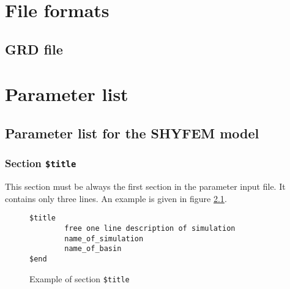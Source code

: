 \documentclass{report}
\begin{document}
	

\chapter{File formats}


	\section{GRD file}
	







\chapter{Parameter list}


\section{Parameter list for the SHYFEM model}


\subsection{Section {\tt \$title}}

This section must be always the first section in the parameter input file.
It contains only three lines. An example is given in 
figure \ref{fig:titleexample}.

\begin{figure}[ht]
\begin{verbatim}
$title
        free one line description of simulation
        name_of_simulation
        name_of_basin
$end
\end{verbatim}
\caption{Example of section {\tt \$title}}
\label{fig:titleexample}
\end{figure}
\end{document}
